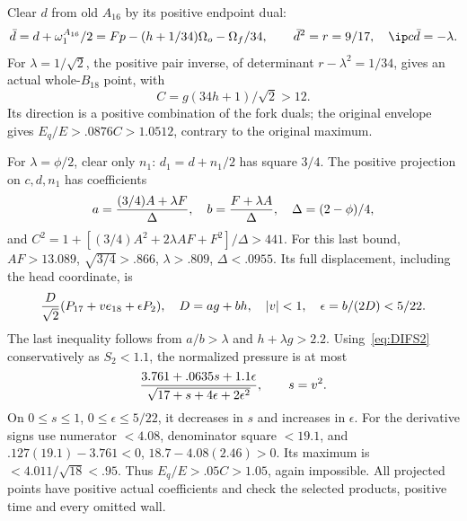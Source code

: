 Clear \(d\) from old \(A_{16}\) by its positive endpoint dual:
\[
 \bar d=d+\omega_1^{A_{16}}/2
       =Fp-(h+1/34)\Omega_o-\Omega_f/34,\qquad
 \bar d^2=r=9/17,\quad \ip c{\bar d}=-\lambda.
\]
For \(\lambda=1/\sqrt2\), the positive pair inverse, of determinant
\(r-\lambda^2=1/34\), gives an actual whole-\(B_{18}\) point,
with
\[
                          C=g(34h+1)/\sqrt2>12 .
\]
Its direction is a positive combination of the fork duals;
the original envelope gives \(E_q/E>.0876C>1.0512\),
contrary to the original maximum.

For \(\lambda=\phi/2\), clear only \(n_1\):
\(d_1=d+n_1/2\) has square \(3/4\).
The positive projection on \(c,d,n_1\) has coefficients
\[
 a={(3/4)A+\lambda F\over\Delta},\quad
 b={F+\lambda A\over\Delta},\quad
 \Delta=(2-\phi)/4,
\]
and
\(C^2=1+[(3/4)A^2+2\lambda AF+F^2]/\Delta>441\).
For this last bound, \(AF>13.089\),
\(\sqrt{3/4}>.866\), \(\lambda>.809\), \(\Delta<.0955\).
Its full displacement, including the head coordinate, is
\[
 {D\over\sqrt2}
   (P_{17}+ve_{18}+\epsilon P_2),\quad
 D=ag+bh,\quad |v|<1,\quad \epsilon=b/(2D)<5/22.
\]
The last inequality follows from \(a/b>\lambda\) and
\(h+\lambda g>2.2\).
Using~\eqref{eq:DIFS2} conservatively as \(S_2<1.1\),
the normalized pressure is at most
\[
 {3.761+.0635s+1.1\epsilon
       \over\sqrt{17+s+4\epsilon+2\epsilon^2}},\qquad s=v^2.
\]
On \(0\le s\le1\), \(0\le\epsilon\le5/22\), it decreases
in \(s\) and increases in \(\epsilon\).
For the derivative signs use numerator \(<4.08\),
denominator square \(<19.1\), and
\(.127(19.1)-3.761<0\),
\(18.7-4.08(2.46)>0\).
Its maximum is \(<4.011/\sqrt{18}<.95\).
Thus \(E_q/E>.05C>1.05\), again impossible.
All projected points have positive actual coefficients and check
the selected products, positive time and every omitted wall.

